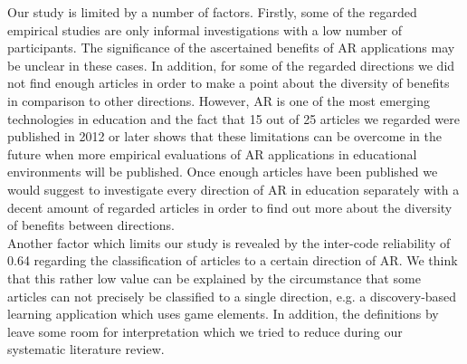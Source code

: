 Our study is limited by a number of factors. Firstly, some of the regarded empirical studies are only informal investigations with a low number of participants. The significance of the ascertained benefits of AR applications may be unclear in these cases. In addition, for some of the regarded directions we did not find enough articles in order to make a point about the diversity of benefits in comparison to other directions. However, AR is one of the most emerging technologies in education and the fact that 15 out of 25 articles we regarded were published in 2012 or later shows that these limitations can be overcome in the future when more empirical evaluations of AR applications in educational environments will be published. Once enough articles have been published we would suggest to investigate every direction of AR in education separately with a decent amount of regarded articles in order to find out more about the diversity of benefits between directions. \\
Another factor which limits our study is revealed by the inter-code reliability of 0.64 regarding the classification of articles to a certain direction of AR. We think that this rather low value can be explained by the circumstance that some articles can not precisely be classified to a single direction, e.g. a discovery-based learning application which uses game elements. In addition, the definitions by \cite{Yuen.2011} leave some room for interpretation which we tried to reduce during our systematic literature review.

